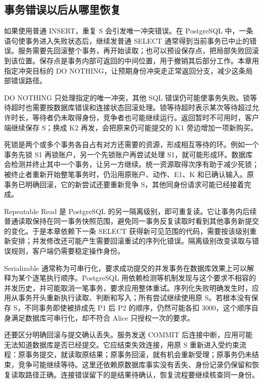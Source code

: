 \subsection*{事务错误以后从哪里恢复}

如果使用普通 INSERT，重复 S 会引发唯一冲突错误。在 PostgreSQL 中，一条语句使事务进入失败状态后，继续发普通 SELECT 通常得到当前事务已中止的错误。服务需要先回滚整个事务，再开始读取；也可以预设保存点，把局部失败回滚到该位置。保存点是事务内部可返回的中间位置，用于撤销其后部分工作。本章用指定冲突目标的 DO NOTHING，让预期身份冲突走正常返回分支，减少这条局部错误路径。

DO NOTHING 只处理指定的唯一冲突，其他 SQL 错误仍可能使事务失败。锁等待超时也需要按数据库错误和连接状态回滚处理。锁等待超时表示某次等待超过允许时长，等待者仍未取得身份，竞争者也可能继续运行。返回暂时不可用时，客户端继续保存 S；换成 K2 再发，会把原来仍可能提交的 K1 旁边增加一项新购买。

死锁是两个或多个事务各自占有对方还需要的资源，形成相互等待的环。例如一个事务先锁 S1 再锁账户，另一个先锁账户再尝试处理 S1，就可能形成环。数据库会检测并终止其中一个事务，让另一方继续。统一资源取得次序有助于减少死锁；被终止者重新开始整笔事务时，仍沿用原账户、动作、E1、K 和已确认输入。原事务已明确回滚，它的新尝试还要重新竞争 S，其他同身份请求可能已经接着完成。

Repeatable Read 是 PostgreSQL 的另一隔离级别，即可重复读。它让事务内后续普通读取保持在同一事务快照范围，避免同一事务反复读取时看到其他事务新提交的变化。于是本章依赖下一条 SELECT 获得新可见范围的代码，需要按该级别重新安排；并发修改还可能产生需要回滚重试的序列化错误。隔离级别改变读取与错误规则，客户端仍需要稳定操作身份。

Serializable 通常称为可串行化，要求成功提交的并发事务在数据库效果上可以解释为某个逐笔执行顺序。PostgreSQL 用依赖检测等机制发现与这个要求不相容的并发历史，并可能取消一笔事务，要求应用整体重试\cite{pg}。序列化失败明确发生时，应用从事务开头重新执行读取、判断和写入；所有尝试继续使用原 S。若根本没有保存 S，不同事务即使被排成先 P1 后 P2 的顺序，仍然可能各扣 3000，这个顺序自身满足数据库可串行化，却不符合 Alice 只授权一次的要求。

还要区分明确回滚与提交确认丢失。服务发送 COMMIT 后连接中断，应用可能无法知道数据库是否已经提交。它应结束失效连接，用原 S 重新进入受约束流程：原事务提交，就读取原结果；原事务回滚，就有机会重新受理；原事务仍未结束，竞争可能继续等待。这里还依赖原数据库事实没有丢失、身份记录仍保留和恢复读取路径正确。连接错误留下的是结果待确认，恢复流程要继续核查同一身份。



